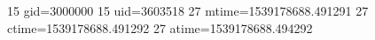 15 gid=3000000
15 uid=3603518
27 mtime=1539178688.491291
27 ctime=1539178688.491292
27 atime=1539178688.494292
